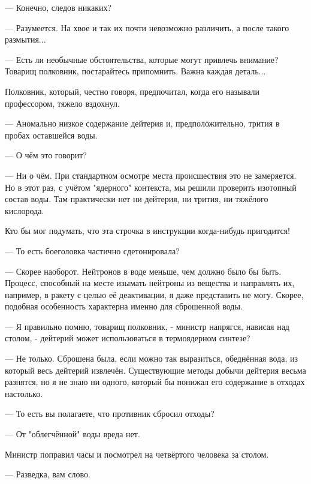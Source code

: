 --- Конечно, следов никаких?

--- Разумеется. На хвое и так их почти невозможно различить, а после такого размытия...

--- Есть ли необычные обстоятельства, которые могут привлечь внимание? Товарищ полковник, постарайтесь припомнить.
Важна каждая деталь...

Полковник, который, честно говоря, предпочитал, когда его называли профессором, тяжело вздохнул.

--- Аномально низкое содержание дейтерия и, предположительно, трития в пробах оставшейся воды.

--- О чём это говорит?

--- Ни о чём. При стандартном осмотре места происшествия это не замеряется. Но в этот раз, с учётом "ядерного" контекста,
мы решили проверить изотопный состав воды. Там практически нет ни дейтерия, ни трития, ни тяжёлого кислорода.

Кто бы мог подумать, что эта строчка в инструкции когда-нибудь пригодится!

--- То есть боеголовка частично сдетонировала?

--- Скорее наоборот. Нейтронов в воде меньше, чем должно было бы быть. Процесс, способный на месте изымать нейтроны из вещества и направлять их, например, в ракету с целью её деактивации, я даже представить не могу. Скорее, подобная особенность характерна именно для сброшенной воды.

--- Я правильно помню, товарищ полковник, - министр напрягся, нависая над столом, - дейтерий может использоваться в термоядерном синтезе?

--- Не только. Сброшена была, если можно так выразиться, обеднённая вода, из который весь дейтерий извлечён. Существующие методы добычи дейтерия весьма разнятся, но я не знаю ни одного, который бы понижал его содержание в отходах настолько.

--- То есть вы полагаете, что противник сбросил отходы?

--- От "облегчённой" воды вреда нет.

Министр поправил часы и посмотрел на четвёртого человека за столом.

--- Разведка, вам слово.

